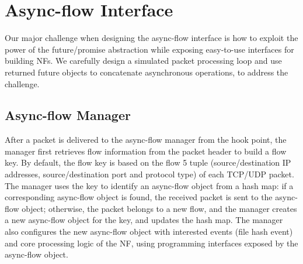 \section{Async-flow Interface}
\label{sec:ai}


Our major challenge when designing the async-flow interface is how to exploit the power of the future/promise abstraction while exposing easy-to-use interfaces for building NFs. We carefully design a simulated packet processing loop and use returned future objects to concatenate asynchronous operations, to address the challenge.

\subsection{Async-flow Manager}
\label{sec:async-flow-manager}


After a packet is delivered to the async-flow manager from the hook point, the manager first retrieves flow information from the packet header to build a flow key. By default, the flow key is based on the flow 5 tuple (source/destination IP addresses, source/destination port and protocol type) of each TCP/UDP
packet. The manager uses the key to identify an async-flow object from a hash map: if a corresponding async-flow object is found, the received packet is sent to the async-flow object; otherwise, the packet belongs to a new flow, and the manager creates a new async-flow object for the key, and updates the hash map. %
The manager also configures the new async-flow object %
 with interested events (file hash event)
and core processing logic of the NF, using programming interfaces exposed by the async-flow object.



